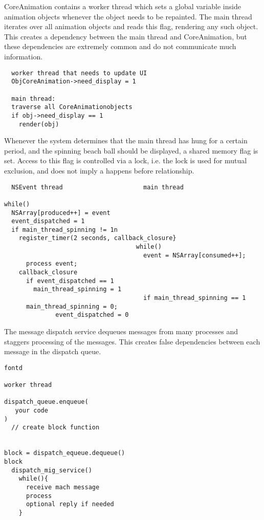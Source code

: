 CoreAnimation contains a worker thread which sets a global variable inside
animation objects whenever the object needs to be repainted. The main thread
iterates over all animation objects and reads this flag, rendering any such
object. This creates a dependency between the main thread and CoreAnimation,
but these dependencies are extremely common and do not communicate much
information.

\begin{verbatim}
  worker thread that needs to update UI
  ObjCoreAnimation->need_display = 1

  main thread:
  traverse all CoreAnimationobjects
  if obj->need_display == 1
    render(obj)
\end{verbatim}

Whenever the system determines that the main thread has hung for a certain period, and the spinning beach ball should be displayed, a shared memory flag is set. Access to this flag is controlled via a lock, i.e. the lock is used for mutual exclusion, and does not imply a happens before relationship.

\begin{verbatim}
  NSEvent thread                      main thread

while()
  NSArray[produced++] = event
  event_dispatched = 1
  if main_thread_spinning != 1n
    register_timer(2 seconds, callback_closure}
                                    while()
                                      event = NSArray[consumed++];
      process event;
    callback_closure
      if event_dispatched == 1
        main_thread_spinning = 1
                                      if main_thread_spinning == 1
      main_thread_spinning = 0;
              event_dispatched = 0
\end{verbatim}

The message dispatch service dequeues messages from many processes and staggers
processing of the messages. This creates false dependencies between each
message in the dispatch queue.
\begin{verbatim}
fontd

worker thread

dispatch_queue.enqueue(
   your code
)
  // create block function


block = dispatch_equeue.dequeue()
block
  dispatch_mig_service()
    while(){
      receive mach message
      process
      optional reply if needed
    }
\end{verbatim}


